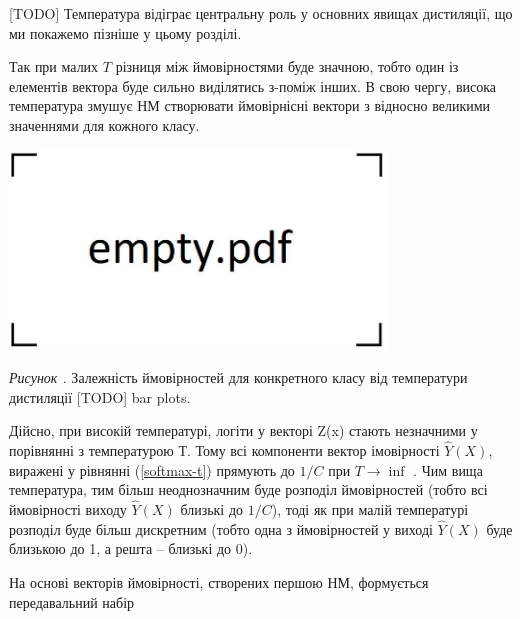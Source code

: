\documentclass[14pt,a4paper]{extarticle}
\newcounter{e}
\newcounter{pic}
\newcommand{\pic}[1]{\refstepcounter{pic} \vspace{-0.3cm}\textit{Рисунок \arabic{pic}\label{#1}.}}
\numberwithin{equation}{section}
\numberwithin{figure}{section}
\begin{document}
 [TODO] Температура відіграє центральну роль у основних явищах дистиляції, що ми покажемо пізніше у цьому розділі.
 
 Так при малих $T$ різниця між ймовірностями буде значною, тобто один із елементів вектора буде сильно виділятись з-поміж інших. В свою чергу, висока температура змушує НМ створювати ймовірнісні вектори з відносно великими значеннями для кожного класу.
 
 \begin{center}
 	\includegraphics[width=10cm]{../images/empty.pdf}
 \end{center}
 \begin{center}
 	\pic{distilation} Залежність ймовірностей для конкретного класу від температури дистиляції [TODO] bar plots.
 \end{center}
 
 Дійсно, при високій температурі, логіти у векторі Z(x) стають незначними
 у порівнянні з температурою $Т$. Тому всі компоненти
 вектор імовірності $\hat{Y}(X)$, виражені у рівнянні (\ref{softmax-t}) прямують до 
 $1/C$ при $T \to \inf$ . Чим вища температура,
 тим більш неоднозначним буде розподіл ймовірностей (тобто всі
 ймовірності виходу $\hat{Y}(X)$ близькі до $1/C$), тоді як
 при малій температурі розподіл буде більш дискретним (тобто одна з ймовірностей у
 виході $\hat{Y}(X)$ буде близькою до 1, а решта -- близькі до 0).
 
 
 На основі векторів ймовірності, створених першою НМ, формується передавальний набір
 
 

 
\end{document}
